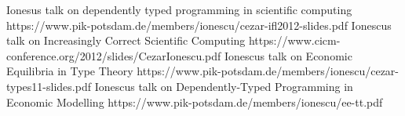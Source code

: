 Ionesus talk on dependently typed programming in scientific computing
https://www.pik-potsdam.de/members/ionescu/cezar-ifl2012-slides.pdf
Ionescus talk on Increasingly Correct Scientific Computing
https://www.cicm-conference.org/2012/slides/CezarIonescu.pdf
Ionescus talk on Economic Equilibria in Type Theory
https://www.pik-potsdam.de/members/ionescu/cezar-types11-slides.pdf
Ionescus talk on Dependently-Typed Programming in Economic Modelling
https://www.pik-potsdam.de/members/ionescu/ee-tt.pdf